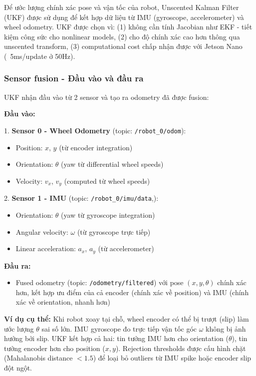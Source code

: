 Để ước lượng chính xác pose và vận tốc của robot, Unscented Kalman Filter (UKF) được sử dụng để kết hợp dữ liệu từ IMU (gyroscope, accelerometer) và wheel odometry. UKF được chọn vì: (1) không cần tính Jacobian như EKF - tiết kiệm công sức cho nonlinear models, (2) cho độ chính xác cao hơn thông qua unscented transform, (3) computational cost chấp nhận được với Jetson Nano (~5ms/update ở 50Hz).

\subsubsection{Sensor fusion - Đầu vào và đầu ra}

UKF nhận đầu vào từ 2 sensor và tạo ra odometry đã được fusion:

\textbf{Đầu vào:}

1. \textbf{Sensor 0 - Wheel Odometry} (topic: \texttt{/robot\_0/odom}):
\begin{itemize}[nosep]
\item Position: $x$, $y$ (từ encoder integration)
\item Orientation: $\theta$ (yaw từ differential wheel speeds)
\item Velocity: $v_x$, $v_y$ (computed từ wheel speeds)
\end{itemize}

2. \textbf{Sensor 1 - IMU} (topic: \texttt{/robot\_0/imu/data},):
\begin{itemize}[nosep]
\item Orientation: $\theta$ (yaw từ gyroscope integration)
\item Angular velocity: $\omega$ (từ gyroscope trực tiếp)
\item Linear acceleration: $a_x$, $a_y$ (từ accelerometer)
\end{itemize}

\textbf{Đầu ra:}
\begin{itemize}[nosep]
\item Fused odometry (topic: \texttt{/odometry/filtered}) với pose $(x, y, \theta)$ chính xác hơn, kết hợp ưu điểm của cả encoder (chính xác về position) và IMU (chính xác về orientation, nhanh hơn)
\end{itemize}

\textbf{Ví dụ cụ thể:} Khi robot xoay tại chỗ, wheel encoder có thể bị trượt (slip) làm ước lượng $\theta$ sai số lớn. IMU gyroscope đo trực tiếp vận tốc góc $\omega$ không bị ảnh hưởng bởi slip. UKF kết hợp cả hai: tin tưởng IMU hơn cho orientation ($\theta$), tin tưởng encoder hơn cho position ($x, y$). Rejection thresholds được cấu hình chặt (Mahalanobis distance $< 1.5$) để loại bỏ outliers từ IMU spike hoặc encoder slip đột ngột.

